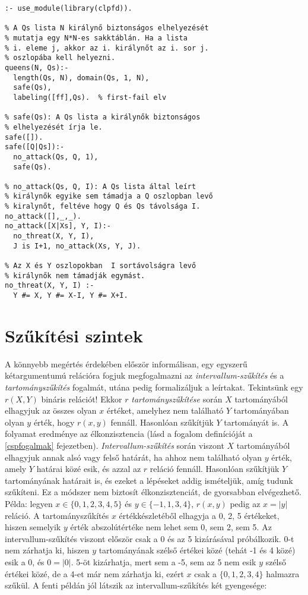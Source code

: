 \begin{verbatim}
:- use_module(library(clpfd)).

% A Qs lista N királynő biztonságos elhelyezését
% mutatja egy N*N-es sakktáblán. Ha a lista
% i. eleme j, akkor az i. királynőt az i. sor j.
% oszlopába kell helyezni.
queens(N, Qs):-
  length(Qs, N), domain(Qs, 1, N),
  safe(Qs),
  labeling([ff],Qs).  % first-fail elv

% safe(Qs): A Qs lista a királynők biztonságos
% elhelyezését írja le.
safe([]).
safe([Q|Qs]):-
  no_attack(Qs, Q, 1),
  safe(Qs).

% no_attack(Qs, Q, I): A Qs lista által leírt
% királynők egyike sem támadja a Q oszlopban levő
% kiralynőt, feltéve hogy Q és Qs távolsága I.
no_attack([],_,_).
no_attack([X|Xs], Y, I):-
  no_threat(X, Y, I),
  J is I+1, no_attack(Xs, Y, J).

% Az X és Y oszlopokban  I sortávolságra levő
% királynők nem támadják egymást.
no_threat(X, Y, I) :-
  Y #= X, Y #= X-I, Y #= X+I.
\end{verbatim}



\section{Szűkítési szintek}
\label{szukites}

A könnyebb megértés érdekében először informálisan, egy egyszerű
kétargumentumú relációra fogjuk megfogalmazni az \emph{intervallum-szűkítés}
és a \emph{tartományszűkítés} fogalmát, utána pedig formalizáljuk a
leírtakat.
\br
Tekintsünk egy $r(X,Y)$ bináris relációt! Ekkor $r$ \emph{tartományszűkítése}
során $X$ tartományából elhagyjuk az összes olyan $x$ értéket, amelyhez nem
található $Y$ tartományában olyan $y$ érték, hogy $r(x,y)$ fennáll. Hasonlóan
szűkítjük $Y$ tartományát is. A folyamat eredménye az élkonzisztencia (lásd
a fogalom definícióját a \ref{cspfogalmak} fejezetben).
\emph{Intervallum-szűkítés} során viszont $X$ tartományából elhagyjuk annak
alsó vagy felső határát, ha ahhoz nem található olyan $y$ érték, amely $Y$
határai közé esik, és azzal az $r$ reláció fennáll. Hasonlóan szűkítjük
$Y$ tartományának határait is, és ezeket a lépéseket addig ismételjük,
amíg tudunk szűkíteni. Ez a módszer nem biztosít élkonzisztenciát, de
gyorsabban elvégezhető.
\br
Példa: legyen $x \in \{0,1,2,3,4,5\}$ és $y \in \{-1,1,3,4\}$, $r(x,y)$ pedig
az $x=|y|$ reláció. A tartományszűkítés $x$ értékkészletéből elhagyja
a 0, 2, 5 értékeket, hiszen semelyik $y$ érték abszolútértéke nem lehet
sem 0, sem 2, sem 5. Az intervallum-szűkítés viszont először csak a 0
és az 5 kizárásával próbálkozik. 0-t nem zárhatja ki, hiszen $y$ tartományának
szélső értékei közé (tehát -1 és 4 közé) esik a 0, és $0=|0|$. 5-öt
kizárhatja, mert sem a -5, sem az 5 nem esik $y$ szélső értékei közé,
de a 4-et már nem zárhatja ki, ezért $x$ csak a $\{0,1,2,3,4\}$ halmazra
szűkül.
\br
A fenti példán jól látszik az intervallum-szűkítés két gyengesége:


